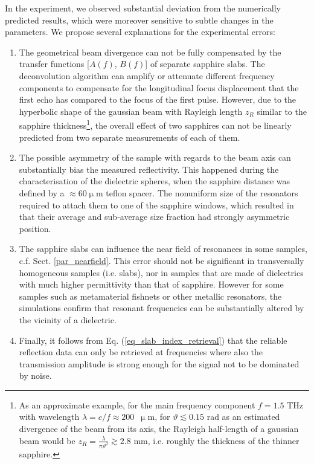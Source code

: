 In the experiment, we observed substantial deviation  %
from the numerically predicted results, which were moreover sensitive to subtle changes in the parameters. We propose  several explanations for the experimental errors:
\begin{enumerate}
\item{The geometrical beam divergence can not be fully compensated by the transfer functions [$A(f)$, $B(f)$] of separate sapphire slabs. The deconvolution algorithm can amplify or attenuate different frequency components to compensate for the  longitudinal focus displacement that the first echo has compared to the focus of the first pulse. However, due to the hyperbolic shape of the gaussian beam with Rayleigh length $z_{R}$ similar to the sapphire thickness\footnote{As an approximate example, for the main frequency component $f = 1.5$ THz with wavelength $\lambda = c / f \approx 200$~$\upmu$m, for $\vartheta \lesssim 0.15$ rad as an estimated divergence of the beam from its axis, the Rayleigh half-length of a gaussian beam would be $z_{R} = \frac{\lambda}{\pi \vartheta^{2}} \gtrsim 2.8$ mm, i.e. roughly the thickness of the thinner sapphire.}, the overall effect of two sapphires can not be linearly predicted from two separate measurements of each of them.} 
 \item{The possible asymmetry of the sample with regards to the beam axis can substantially bias the measured reflectivity. This happened during the characterisation of the dielectric spheres, when the sapphire distance was defined by a $\approx$60$\upmu$m teflon spacer. The nonuniform size of the resonators required to attach them to one of the sapphire windows, which resulted in that their average and sub-average size fraction had strongly asymmetric position. } 
 \item{The sapphire slabs can influence the near field of resonances in some samples, c.f. Sect. \ref{par_nearfield}. This error should not be significant in transversally homogeneous samples (i.e. slabs), nor in samples that are made of dielectrics with much higher permittivity than that of sapphire. However for some samples such as metamaterial fishnets or other metallic resonators, the simulations confirm that resonant frequencies can be substantially altered by the vicinity of a dielectric. }
 \item{Finally, it follows from Eq. (\ref{eq_slab_index_retrieval}) %
 that the reliable reflection data can only be retrieved at frequencies where also the transmission amplitude is strong enough for the signal not to be dominated by noise. }
 \end{enumerate}

